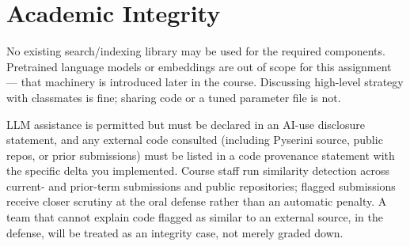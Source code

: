 \documentclass[10pt]{article}
\begin{document}
\section{Academic Integrity}
No existing search/indexing library may be used for the required components. Pretrained language models or embeddings are out of scope for this assignment — that machinery is introduced later in the course. Discussing high-level strategy with classmates is fine; sharing code or a tuned parameter file is not.

LLM assistance is permitted but must be declared in an AI-use disclosure statement, and any external code consulted (including Pyserini source, public repos, or prior submissions) must be listed in a code provenance statement with the specific delta you implemented. Course staff run similarity detection across current- and prior-term submissions and public repositories; flagged submissions receive closer scrutiny at the oral defense rather than an automatic penalty. A team that cannot explain code flagged as similar to an external source, in the defense, will be treated as an integrity case, not merely graded down.
\end{document}
